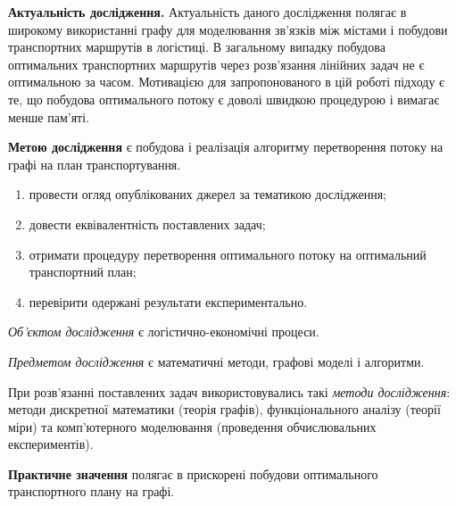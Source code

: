 
\textbf{Актуальність дослідження.} Актуальність даного дослідження полягає в широкому використанні графу для моделювання
зв'язків між містами і побудови транспортних маршрутів в логістиці. В загальному випадку побудова оптимальних транспортних
маршрутів через розв'язання лінійних задач не є оптимальною за часом. Мотивацією для запропонованого в цій роботі підходу
є те, що побудова оптимального потоку є доволі швидкою процедурою і вимагає менше пам'яті.

\textbf{Метою дослідження} є побудова і реалізація алгоритму перетворення потоку на графі на план транспортування.

\begin{enumerate}
    \item провести огляд опублікованих джерел за тематикою дослідження;
    \item довести еквівалентність поставлених задач;
    \item отримати процедуру перетворення оптимального потоку на оптимальний транспортний план;
    \item перевірити одержані результати експериментально.
\end{enumerate}

\textit{Об'єктом дослідження} є логістично-економічні процеси.

\textit{Предметом дослідження} є математичні методи, графові моделі і алгоритми.

При розв'язанні поставлених задач використовувались такі \textit{методи дослідження}: методи дискретної математики (теорія графів),
функціонального аналізу (теорії міри) та комп'ютерного моделювання (проведення обчислювальних експериментів).

\textbf{Практичне значення} полягає в прискорені побудови оптимального транспортного плану на графі.